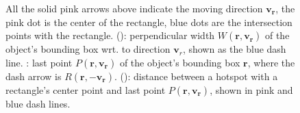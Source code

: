 \begin{figure}
\begin{subfigure}{0.42\linewidth}
    \subcaption{}
    \label{subfig:semantic-last-pt-dist}
\end{subfigure}%
\caption{All the solid pink arrows above indicate the moving direction $\bm{v_r}$, the pink dot is the center of the rectangle, blue dots are the intersection points with the rectangle. (): perpendicular width $W(\bm{r}, \bm{v_r})$ of the object's bounding box wrt. to  direction $\bm{v}_{r}$, shown as the blue dash line. : last point $P(\bm{r}, \bm{v_r})$ of the object's bounding box $\bm{r}$, where the dash arrow is $R(\bm{r}, \bm{-v_r})$. (): distance between a hotspot with a rectangle's center point and last point $P(\bm{r}, \bm{v_r})$, shown in pink and blue dash lines.}
\label{fig:semantic-perp-width}
\end{figure}